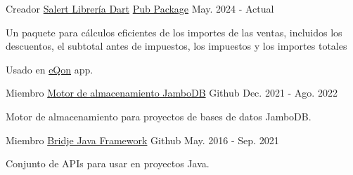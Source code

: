 
\begin{cventries}

  \cventry
    {Creador} %
    {\href{https://github.com/zp1ke/salert}{Salert Librería Dart}} %
    {\href{https://pub.dev/packages/salert}{Pub Package}} %
    {May. 2024 - Actual} %
    {
      \begin{cvitems} %
        \item {Un paquete para cálculos eficientes de los importes de las ventas, incluidos los descuentos, el subtotal antes de impuestos, los impuestos y los importes totales}
        \item {Usado en {\href{https://eqon.ec/}{eQon}} app.}
      \end{cvitems}
    }

  \cventry
    {Miembro} %
    {\href{https://github.com/jambodb/jambodb-storage}{Motor de almacenamiento JamboDB}} %
    {\faGithubSquare\acvHeaderIconSep Github} %
    {Dec. 2021 - Ago. 2022} %
    {
      \begin{cvitems} %
        \item {Motor de almacenamiento para proyectos de bases de datos JamboDB.}
      \end{cvitems}
    }

  \cventry
    {Miembro} %
    {\href{https://github.com/touwolf/bridje-framework}{Bridje Java Framework}} %
    {\faGithubSquare\acvHeaderIconSep Github} %
    {May. 2016 - Sep. 2021} %
    {
      \begin{cvitems} %
        \item {Conjunto de APIs para usar en proyectos Java.}
      \end{cvitems}
    }


\end{cventries}

